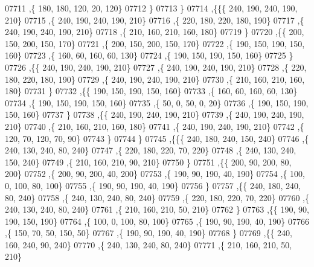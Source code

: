 \begin{DoxyCode}
07711     ,\{   180,   180,   120,    20,   120\}
07712     \}
07713    \}
07714   ,\{\{\{   240,   190,   240,   190,   210\}
07715     ,\{   240,   190,   240,   190,   210\}
07716     ,\{   220,   180,   220,   180,   190\}
07717     ,\{   240,   190,   240,   190,   210\}
07718     ,\{   210,   160,   210,   160,   180\}
07719     \}
07720    ,\{\{   200,   150,   200,   150,   170\}
07721     ,\{   200,   150,   200,   150,   170\}
07722     ,\{   190,   150,   190,   150,   160\}
07723     ,\{   160,    60,   160,    60,   130\}
07724     ,\{   190,   150,   190,   150,   160\}
07725     \}
07726    ,\{\{   240,   190,   240,   190,   210\}
07727     ,\{   240,   190,   240,   190,   210\}
07728     ,\{   220,   180,   220,   180,   190\}
07729     ,\{   240,   190,   240,   190,   210\}
07730     ,\{   210,   160,   210,   160,   180\}
07731     \}
07732    ,\{\{   190,   150,   190,   150,   160\}
07733     ,\{   160,    60,   160,    60,   130\}
07734     ,\{   190,   150,   190,   150,   160\}
07735     ,\{    50,     0,    50,     0,    20\}
07736     ,\{   190,   150,   190,   150,   160\}
07737     \}
07738    ,\{\{   240,   190,   240,   190,   210\}
07739     ,\{   240,   190,   240,   190,   210\}
07740     ,\{   210,   160,   210,   160,   180\}
07741     ,\{   240,   190,   240,   190,   210\}
07742     ,\{   120,    70,   120,    70,    90\}
07743     \}
07744    \}
07745   ,\{\{\{   240,   180,   240,   150,   240\}
07746     ,\{   240,   130,   240,    80,   240\}
07747     ,\{   220,   180,   220,    70,   220\}
07748     ,\{   240,   130,   240,   150,   240\}
07749     ,\{   210,   160,   210,    90,   210\}
07750     \}
07751    ,\{\{   200,    90,   200,    80,   200\}
07752     ,\{   200,    90,   200,    40,   200\}
07753     ,\{   190,    90,   190,    40,   190\}
07754     ,\{   100,     0,   100,    80,   100\}
07755     ,\{   190,    90,   190,    40,   190\}
07756     \}
07757    ,\{\{   240,   180,   240,    80,   240\}
07758     ,\{   240,   130,   240,    80,   240\}
07759     ,\{   220,   180,   220,    70,   220\}
07760     ,\{   240,   130,   240,    80,   240\}
07761     ,\{   210,   160,   210,    50,   210\}
07762     \}
07763    ,\{\{   190,    90,   190,   150,   190\}
07764     ,\{   100,     0,   100,    80,   100\}
07765     ,\{   190,    90,   190,    40,   190\}
07766     ,\{   150,    70,    50,   150,    50\}
07767     ,\{   190,    90,   190,    40,   190\}
07768     \}
07769    ,\{\{   240,   160,   240,    90,   240\}
07770     ,\{   240,   130,   240,    80,   240\}
07771     ,\{   210,   160,   210,    50,   210\}

\end{DoxyCode}
